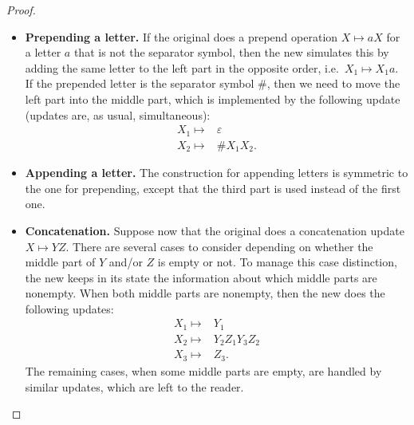 \begin{proof}
\begin{itemize}
 \begin{itemize}
    \item \textbf{Prepending a letter.} If the original \sst does a prepend operation $X \mapsto  aX$ for a letter $a$ that is not the separator symbol, then the new \sst simulates this by adding the same letter to the left part in the opposite order, i.e.~$X_1 \mapsto  X_1a$. If the prepended letter is the separator symbol $\#$, then we need to move the left part into the middle part, which is implemented by the following update (updates are, as usual, simultaneous): 
    \begin{align*}
    X_1 \mapsto &  \varepsilon \\ 
    X_2 \mapsto  & \# X_1 X_2.
    \end{align*}
    \item \textbf{Appending a letter.} The construction for appending letters is symmetric to the one for prepending, except that the third part is used  instead of the first one.
    \item \textbf{Concatenation.} Suppose now that the original \sst does a concatenation update $X \mapsto  YZ$. There are several cases to consider depending on whether the middle part of $Y$ and/or $Z$ is empty or not. To manage this case distinction, the new \sst keeps in its state the information about which middle parts are nonempty. When both middle parts are nonempty, then the new \sst does the following updates: 
\begin{align*}
X_1 \mapsto & Y_1  \\
X_2 \mapsto & Y_2 Z_1 Y_3 Z_2 \\
X_3 \mapsto & Z_3.
\end{align*}
The remaining cases, when some middle parts are empty, are handled by similar updates, which are left to the reader. 
 \end{itemize}
 

\end{itemize}
\end{proof}
